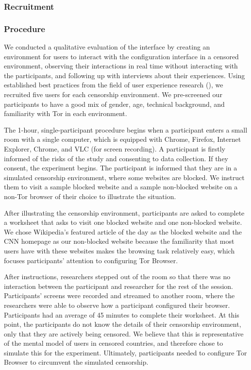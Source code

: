 \documentclass{template}
\begin{document}
\subsubsection{Recruitment}

\subsubsection{Procedure}
We conducted a qualitative evaluation of the interface by creating an environment 
for users to interact with the configuration interface in a censored environment, 
observing their interactions in real time without interacting with the participants, 
and following up with interviews about their experiences.
Using established best practices from the field of user experience research
(\cite{howmanyusers}), we recruited five users for each censorship environment.
We pre-screened our participants to have a good mix of gender, age, technical
background, and familiarity with Tor in each environment. 


The 1-hour, single-participant procedure begins when a participant enters a small 
room with a single computer, which is equipped with Chrome, Firefox, Internet Explorer, 
Chrome, and VLC (for screen recording). A participant is firstly informed of 
the risks of the study and consenting to data collection. If they consent, the 
experiment begins. The participant is informed that they are in a
simulated censorship environment, where some websites are blocked. We
instruct them to visit a sample blocked website and a sample non-blocked website on a
non-Tor browser of their choice to illustrate the situation.

After illustrating the censorship environment, participants are asked to 
complete a worksheet that asks to visit one blocked website and one non-blocked website. 
We chose Wikipedia's featured article of the day as the blocked website and 
the CNN homepage as our non-blocked website because the familiarity 
that most users have with these websites makes the browsing task relatively easy, 
which focuses participants' attention to configuring Tor Browser. 

After instructions, researchers stepped out of the room so that there was no interaction
between the participant and researcher for the rest of the session. Participants' screens 
were recorded and streamed to another room, where the researchers were able to 
observe how a participant configured their browser. Participants had an 
average of 45 minutes to complete their worksheet. 
At this point, the participants do not know the details of their censorship environment,
only that they are actively being censored. We believe that this is representative 
of the mental model of users in censored countries, and therefore chose to simulate 
this for the experiment. Ultimately, participants needed to configure Tor Browser to 
circumvent the simulated censorship. 
\end{document}

